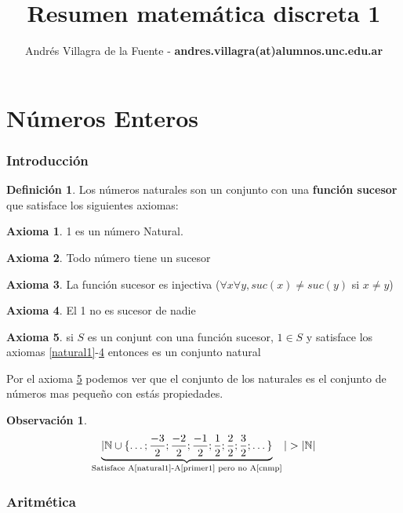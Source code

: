 \documentclass[9pt,a4paper]{article}
\title{Resumen matemática discreta 1}
\author{Andrés Villagra de la Fuente - {\bfseries  andres.villagra(at)alumnos.unc.edu.ar}}
\theoremstyle{definition}
\newtheorem{defi}{Definición}
\newtheorem{axi}{Axioma}
\theoremstyle{plain}
\newtheorem{obs}{Observación}
\begin{document}
\maketitle

\part{Números Enteros}

\section{Introducción}

\begin{defi} Los números naturales son un conjunto con una {\bfseries función  sucesor} que satisface los siguientes axiomas: \end{defi}

\begin{axi} \label{natual1}1 es un número Natural. \end{axi}
\begin{axi} \label{suc}Todo número tiene un sucesor\end{axi}
\begin{axi} \label{sucind}La función sucesor es injectiva ($\forall x \forall y, suc(x) \neq suc(y)$ si $x \neq y$)\end{axi}
\begin{axi} \label{primer1}El 1 no es sucesor de nadie\end{axi}
\begin{axi} \label{cnmp}si $S$ es un conjunt con una función sucesor, $1 \in S$ y satisface los axiomas \ref{natural1}-\ref{primer1} entonces es un conjunto natural\end{axi}

Por el axioma \ref{cnmp} podemos ver que el conjunto de los naturales es el conjunto de números mas pequeño con estás propiedades.

\begin{obs}
\begin{equation*}
\underbrace{|\mathbb{N}\cup\{\dots;\frac{-3}{2};\frac{-2}{2};\frac{-1}{2};\frac{1}{2};\frac{2}{2};\frac{3}{2};\dots\}}_\text{Satisface A\ref{natural1}-A\ref{primer1} pero no A\ref{cnmp}}|>|\mathbb{N}|
\end{equation*}
\end{obs}

\section{Aritmética}
\end{document}
